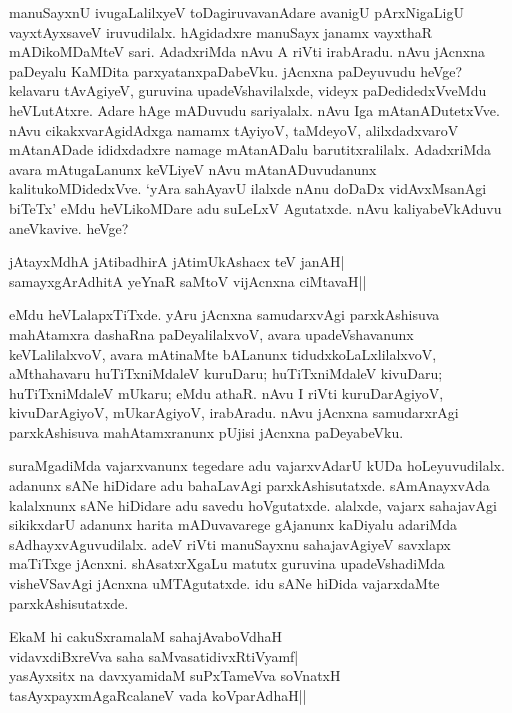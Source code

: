 manuSayxnU ivugaLalilxyeV toDagiruvavanAdare avanigU pArxNigaLigU vayxtAyxsaveV iruvudilalx. hAgidadxre manuSayx janamx vayxthaR 
mADikoMDaMteV sari. AdadxriMda nAvu A riVti irabAradu. nAvu jAcnxna paDeyalu KaMDita parxyatanxpaDabeVku. jAcnxna paDeyuvudu heVge? kelavaru 
tAvAgiyeV, guruvina upadeVshavilalxde, videyx paDedidedxVveMdu heVLutAtxre. Adare hAge mADuvudu sariyalalx. nAvu Iga mAtanADutetxVve. nAvu 
cikakxvarAgidAdxga namamx tAyiyoV, taMdeyoV, alilxdadxvaroV mAtanADade ididxdadxre namage mAtanADalu barutitxralilalx. AdadxriMda 
avara mAtugaLanunx keVLiyeV nAvu mAtanADuvudanunx kalitukoMDidedxVve. `yAra sahAyavU ilalxde nAnu doDaDx vidAvxMsanAgi biTeTx' eMdu 
heVLikoMDare adu suLeLxV Agutatxde. nAvu kaliyabeVkAduvu aneVkavive. heVge?

\begin{shloka}
jAtayxMdhA jAtibadhirA jAtimUkAshacx teV janAH|\\
samayxgArAdhitA yeYnaR saMtoV vijAcnxna ciMtavaH||
\end{shloka}

eMdu heVLalapxTiTxde. yAru jAcnxna samudarxvAgi parxkAshisuva mahAtamxra dashaRna paDeyalilalxvoV, avara upadeVshavanunx keVLalilalxvoV, 
avara mAtinaMte bALanunx tidudxkoLaLxlilalxvoV, aMthahavaru huTiTxniMdaleV kuruDaru; huTiTxniMdaleV kivuDaru; huTiTxniMdaleV 
mUkaru; eMdu athaR. nAvu I riVti kuruDarAgiyoV, kivuDarAgiyoV, mUkarAgiyoV, irabAradu. nAvu jAcnxna 
samudarxrAgi parxkAshisuva mahAtamxranunx pUjisi jAcnxna paDeyabeVku.

suraMgadiMda vajarxvanunx tegedare adu vajarxvAdarU kUDa hoLeyuvudilalx. adanunx sANe hiDidare adu bahaLavAgi parxkAshisutatxde. 
sAmAnayxvAda kalalxnunx sANe hiDidare adu savedu hoVgutatxde. alalxde, vajarx sahajavAgi sikikxdarU adanunx harita mADuvavarege gAjanunx 
kaDiyalu adariMda sAdhayxvAguvudilalx. adeV riVti manuSayxnu sahajavAgiyeV savxlapx maTiTxge jAcnxni. shAsatxrXgaLu matutx guruvina 
upadeVshadiMda visheVSavAgi jAcnxna uMTAgutatxde. idu sANe hiDida vajarxdaMte parxkAshisutatxde.

\begin{shloka}
EkaM hi cakuSxramalaM sahajAvaboVdhaH\\
vidavxdiBxreVva saha saMvasatidivxRtiVyamf|\\
yasAyxsitx na davxyamidaM suPxTameVva soV\s natxH\\
tasAyxpayxmAgaRcalaneV vada koV\s parAdhaH||
\end{shloka}

